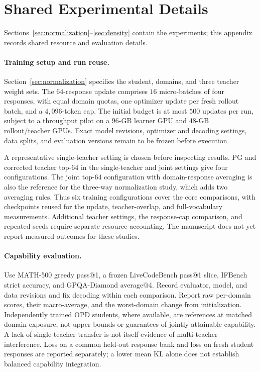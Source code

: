 \section{Shared Experimental Details}
\label{app:setup}

Sections~\ref{sec:normalization}--\ref{sec:density} contain the experiments;
this appendix records shared resource and evaluation details.

\paragraph{Training setup and run reuse.}
Section~\ref{sec:normalization} specifies the student, domains, and three
teacher weight sets. The $64$-response update comprises $16$ micro-batches
of four responses, with equal domain quotas, one optimizer update per
fresh rollout batch, and a $4{,}096$-token cap.
The initial budget is at most $500$ updates per run, subject to a
throughput pilot on a $96$-GB learner GPU and $48$-GB rollout/teacher GPUs.
Exact model revisions, optimizer and decoding settings, data splits,
and evaluation versions remain to be frozen before execution.

A representative single-teacher setting is chosen before inspecting
results. PG and corrected teacher top-$64$ in the single-teacher and
joint settings give four configurations. The joint top-$64$ configuration
with domain-response averaging is also the reference for the three-way
normalization study, which adds two averaging rules. Thus six training
configurations cover the core comparisons, with checkpoints reused for
the update, teacher-overlap, and full-vocabulary measurements.
Additional teacher settings, the response-cap comparison, and repeated
seeds require separate resource accounting. The manuscript does not yet
report measured outcomes for these studies.

\paragraph{Capability evaluation.}
Use MATH-500 greedy pass@1, a frozen LiveCodeBench pass@1 slice,
IFBench strict accuracy, and GPQA-Diamond average@4. Record evaluator,
model, and data revisions and fix decoding within each comparison.
Report raw per-domain scores, their macro-average, and the worst-domain
change from initialization. Independently trained OPD students, where
available, are references at matched domain exposure, not upper bounds
or guarantees of jointly attainable capability. A lack of single-teacher
transfer is not itself evidence of multi-teacher interference.
Loss on a common held-out response bank and loss on fresh student
responses are reported separately; a lower mean KL alone does not
establish balanced capability integration.

